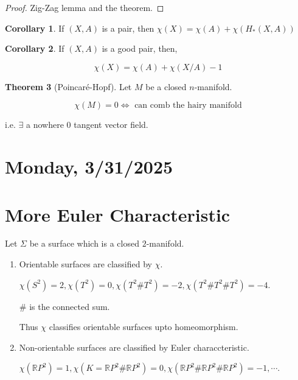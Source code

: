 \documentclass{article}
\theoremstyle{definition}
\newtheorem{theorem}{Theorem}
\newtheorem{corollary}[theorem]{Corollary}
\begin{document}
    \begin{proof}
        Zig-Zag lemma and the theorem. 
    \end{proof}

    \begin{corollary}
        If \((X,A)\) is a pair, then \(\chi(X) = \chi(A) + \chi(H_{\ast} (X,A))\)
    \end{corollary}

    \begin{corollary}
        If \((X,A)\) is a good pair, then,

        \[
            \chi(X) = \chi(A) + \chi (X / A) - 1
        \]
    \end{corollary}

    \begin{theorem}
        [Poincar\'e-Hopf] Let \(M\) be a closed \(n\)-manifold.

        \[
            \chi(M) = 0 \iff \text{ can comb the hairy manifold} 
        \]

        i.e. \(\exists\) a nowhere \(0\) tangent vector field.
    \end{theorem}

    \section*{Monday, 3/31/2025}
    
    \section*{More Euler Characteristic}

    Let \(\Sigma\) be a surface which is a closed \(2\)-manifold.

    \begin{enumerate}[label=\roman*)]
        \item Orientable surfaces are classified by \(\chi\).
        
        \(\chi(S^2) = 2, \chi(T^2) = 0, \chi(T^2 \# T^2) = -2, \chi(T^2 \# T^2 \# T^2) = -4\).

        \(\#\) is the connected sum.

        Thus \(\chi\) classifies orientable surfaces upto homeomorphism.
        
        \item Non-orientable surfaces are classified by Euler characcteristic.
        
        \(\chi(\mathbb{R}P^2) = 1, \chi(K = \mathbb{R} P^2 \# \mathbb{R} P^2) = 0, \chi(\mathbb{R} P^2 \# \mathbb{R} P^2 \# \mathbb{R}P^2) = -1, \cdots\). 
    \end{enumerate} 
\end{document}
